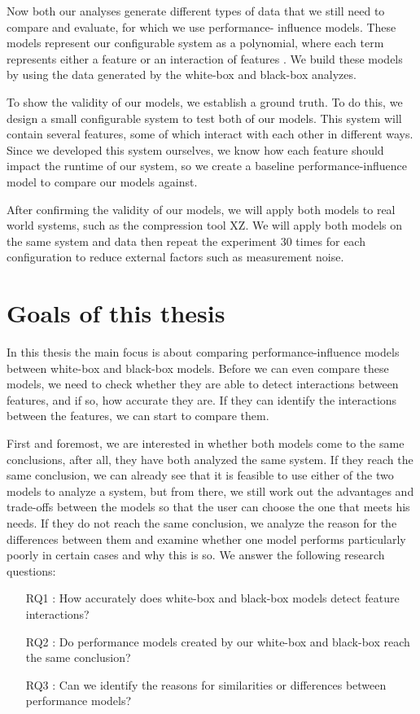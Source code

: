Now both our analyses generate different types of data that we still need to compare and evaluate, for which we use performance-
influence models. These models represent our configurable system as a polynomial, where each term represents either a feature or an 
interaction of features \cite{Performance-influence-models-for-highly-configurable-systems}. We build these models by using the data generated 
by the white-box and black-box analyzes.

To show the validity of our models, we establish a ground truth. To do this, we design a small configurable system to test both of our 
models. This system will contain several features, some of which interact with each other in different ways. 
Since we developed this system ourselves, we know how each feature should impact the runtime of our system, so we create
a baseline performance-influence model to compare our models against.

After confirming the validity of our models, we will apply both models to real world systems, such as the compression tool
XZ. We will apply both models on the same system and data then repeat the experiment 30 times for each configuration to reduce external
factors such as measurement noise.

\section{Goals of this thesis}
In this thesis the main focus is about comparing performance-influence models between white-box and black-box models. 
Before we can even compare these models, we need to check whether they are able to detect interactions between features, 
and if so, how accurate they are. If they can identify the interactions between the features, we can start to compare them. 

First and foremost, we are interested in whether both models come to the same conclusions, after all, they have both analyzed the same system. 
If they reach the same conclusion, we can already see that it is feasible to use either of the two models to analyze a system, 
but from there, we still work out the advantages and trade-offs between the models so that the user can choose the one that meets 
his needs. If they do not reach the same conclusion, we analyze the reason for the differences between them and examine whether one model 
performs particularly poorly in certain cases and why this is so. We answer the following research questions:

\begin{itemize}\label{researchQuestions}
\item[RQ1]: How accurately does white-box and black-box models detect feature interactions? 
\item[RQ2]: Do performance models created by our white-box and black-box reach the same conclusion?
\item[RQ3]: Can we identify the reasons for similarities or differences between performance models?
\end{itemize}
